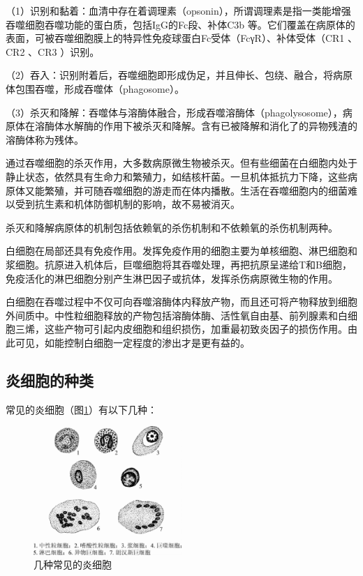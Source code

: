 （1）识别和黏着：血清中存在着调理素（opsonin），所谓调理素是指一类能增强吞噬细胞吞噬功能的蛋白质，包括IgG的Fc段、补体C{3b}
等。它们覆盖在病原体的表面，可被吞噬细胞膜上的特异性免疫球蛋白Fc受体（FcγR）、补体受体（CR{1}
、CR{2} 、CR{3} ）识别。

（2）吞入：识别附着后，吞噬细胞即形成伪足，并且伸长、包绕、融合，将病原体包围吞噬，形成吞噬体（phagosome）。

（3）杀灭和降解：吞噬体与溶酶体融合，形成吞噬溶酶体（phagolysosome），病原体在溶酶体水解酶的作用下被杀灭和降解。含有已被降解和消化了的异物残渣的溶酶体称为残体。

通过吞噬细胞的杀灭作用，大多数病原微生物被杀灭。但有些细菌在白细胞内处于静止状态，依然具有生命力和繁殖力，如结核杆菌。一旦机体抵抗力下降，这些病原体又能繁殖，并可随吞噬细胞的游走而在体内播散。生活在吞噬细胞内的细菌难以受到抗生素和机体防御机制的影响，故不易被消灭。

杀灭和降解病原体的机制包括依赖氧的杀伤机制和不依赖氧的杀伤机制两种。

白细胞在局部还具有免疫作用。发挥免疫作用的细胞主要为单核细胞、淋巴细胞和浆细胞。抗原进入机体后，巨噬细胞将其吞噬处理，再把抗原呈递给T和B细胞，免疫活化的淋巴细胞分别产生淋巴因子或抗体，发挥杀伤病原微生物的作用。

白细胞在吞噬过程中不仅可向吞噬溶酶体内释放产物，而且还可将产物释放到细胞外间质中。中性粒细胞释放的产物包括溶酶体酶、活性氧自由基、前列腺素和白细胞三烯，这些产物可引起内皮细胞和组织损伤，加重最初致炎因子的损伤作用。由此可见，如能控制白细胞一定程度的渗出才是更有益的。

\subsection{炎细胞的种类}

常见的炎细胞（图\ref{fig4-4}）有以下几种：

\begin{figure}[!htbp]
 \centering
 \includegraphics[width=0.5\textwidth]{./images/Image00054.jpg}
 \caption{几种常见的炎细胞}
 \label{fig4-4}
  \end{figure} 

